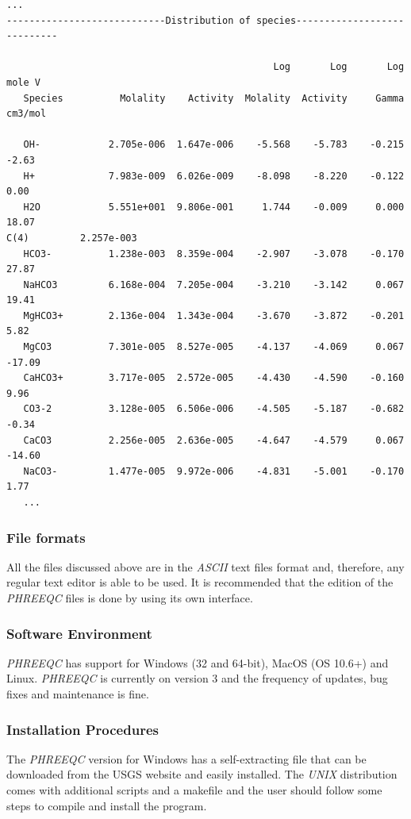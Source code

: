 \documentclass[ppgc,mestrado,english]{iiufrgs}
\begin{document}
\begin{lstlisting}[frame=single, caption=\emph{PHREEQC}'s excerpt from the output file, label=phreeqc:output]
...
----------------------------Distribution of species----------------------------
 
                                               Log       Log       Log    mole V
   Species          Molality    Activity  Molality  Activity     Gamma   cm3/mol
 
   OH-            2.705e-006  1.647e-006    -5.568    -5.783    -0.215     -2.63
   H+             7.983e-009  6.026e-009    -8.098    -8.220    -0.122      0.00
   H2O            5.551e+001  9.806e-001     1.744    -0.009     0.000     18.07
C(4)         2.257e-003
   HCO3-          1.238e-003  8.359e-004    -2.907    -3.078    -0.170     27.87
   NaHCO3         6.168e-004  7.205e-004    -3.210    -3.142     0.067     19.41
   MgHCO3+        2.136e-004  1.343e-004    -3.670    -3.872    -0.201      5.82
   MgCO3          7.301e-005  8.527e-005    -4.137    -4.069     0.067    -17.09
   CaHCO3+        3.717e-005  2.572e-005    -4.430    -4.590    -0.160      9.96
   CO3-2          3.128e-005  6.506e-006    -4.505    -5.187    -0.682     -0.34
   CaCO3          2.256e-005  2.636e-005    -4.647    -4.579     0.067    -14.60
   NaCO3-         1.477e-005  9.972e-006    -4.831    -5.001    -0.170      1.77
   ...
\end{lstlisting}

\subsubsection{File formats}
All the files discussed above are in the \emph{ASCII} text files format and, therefore, any regular text editor is able to be used. It is recommended that the edition of the \emph{PHREEQC} files is done by using its own interface.

\subsubsection{Software Environment}
\emph{PHREEQC} has support for Windows (32 and 64-bit), MacOS (OS 10.6+) and Linux. \emph{PHREEQC} is currently on version 3 and the frequency of updates, bug fixes and maintenance is fine.

\subsubsection{Installation Procedures}
The \emph{PHREEQC} version for Windows has a self-extracting file that can be downloaded from the USGS website and easily installed. The \emph{UNIX} distribution comes with additional scripts and a makefile and the user should follow some steps to compile and install the program.
\end{document}
